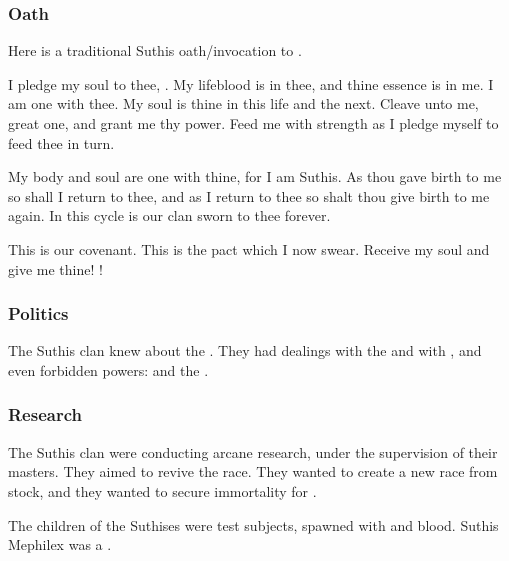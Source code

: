 \subsubsection{Oath}
Here is a traditional Suthis oath/invocation to \Ubloth.


\begin{diary}%
  I pledge my soul to thee, \Ubloth.
  My lifeblood is in thee, and thine essence is in me. 
  I am one with thee. 
  My soul is thine in this life and the next. 
  Cleave unto me, great one, and grant me thy power. 
  Feed me with strength as I pledge myself to feed thee in turn. 
  
  My body and soul are one with thine, for I am Suthis. 
  As thou gave birth to me so shall I return to thee, and as I return to thee so shalt thou give birth to me again. 
  In this cycle is our clan sworn to thee forever. 
  
  This is our covenant.
  This is the pact which I now swear. 
  Receive my soul and give me thine!
  \Ubloth!
\end{diary}





\subsubsection{Politics}
The Suthis clan knew about the . 
They had dealings with the \ophidians and with \Thessulax, and even forbidden powers: 
\Ubloth and the \xss. 





\subsubsection{Research}
The Suthis clan were conducting arcane research, under the supervision of their \ophidian masters.
They aimed to revive the \ophidian race.
They wanted to create a new \ophidian race from \scathaese stock, and they wanted to secure immortality for .

The children of the Suthises were test subjects, spawned with \ophidian and \draconic blood.
Suthis Mephilex was a .





